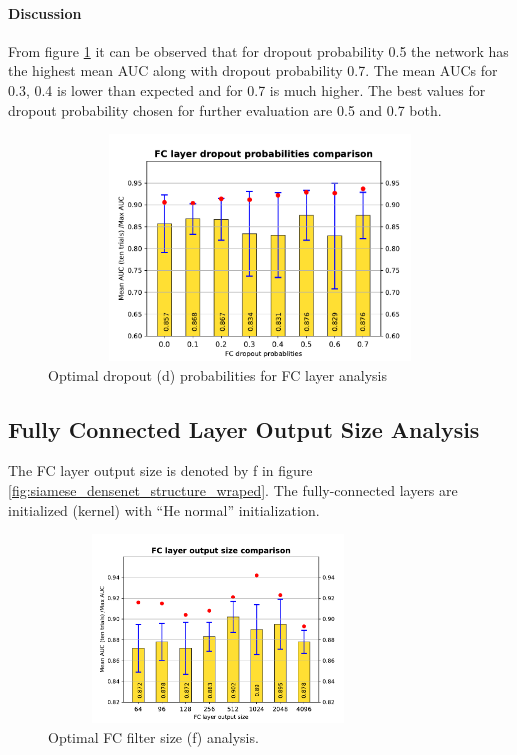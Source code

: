 \paragraph{Discussion\\}
From figure \ref{fig:fc_dropout} it can be observed that for dropout probability 0.5 the network has the highest mean AUC along with dropout probability 0.7. 
The mean AUCs for 0.3, 0.4 is lower than expected and for 0.7 is much higher. The best values for dropout probability chosen for further evaluation are 0.5 and 0.7 both.\\
\begin{figure}[ht]
\centering
\includegraphics[width=12cm,height=6cm]{images/densenet/siamese/densenet_siamese_FC_dropout}
\caption{Optimal dropout (d) probabilities for FC layer analysis}
\label{fig:fc_dropout}
\end{figure}



\subsection{Fully Connected Layer Output Size Analysis}
The FC layer output size is denoted by f in figure \ref{fig:siamese_densenet_structure_wraped}.
The fully-connected layers are initialized (kernel) with “He normal” initialization.
\begin{figure}[ht]
\centering
\includegraphics[width=9cm,height=5cm]{images/densenet/siamese/densenet_siamese_FC_out}
\caption{Optimal FC filter size (f) analysis.}
\label{fig:fc_filter_size}
\end{figure}

